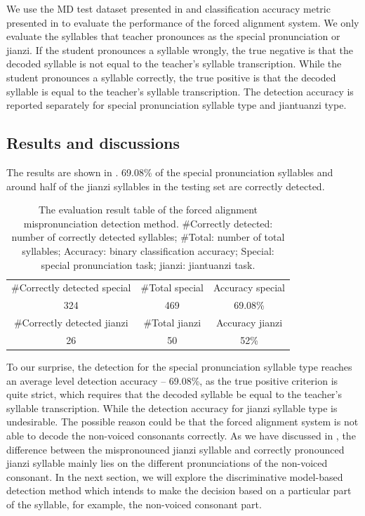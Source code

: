 We use the MD test dataset presented in  and classification accuracy metric presented in  to evaluate the performance of the forced alignment system. We only evaluate the syllables that teacher pronounces as the special pronunciation or \gls{jianzi}. If the student pronounces a syllable wrongly, the true negative is that the decoded syllable is not equal to the teacher's syllable transcription. While the student pronounces a syllable correctly, the true positive is that the decoded syllable is equal to the teacher's syllable transcription. The detection accuracy is reported separately for special pronunciation syllable type and \gls{jiantuanzi} type.

\subsection{Results and discussions}

The results are shown in . 69.08\% of the special pronunciation syllables and around half of the \gls{jianzi} syllables in the testing set are correctly detected.

\begin{table}[ht!]
\centering
\caption{The evaluation result table of the forced alignment mispronunciation detection method. \#Correctly detected: number of correctly detected syllables; \#Total: number of total syllables; Accuracy: binary classification accuracy; Special: special pronunciation task; jianzi: jiantuanzi task.}
\label{tab:ch6:forced_alignment_results}
\begin{tabular}{ccc}
\toprule
\#Correctly detected special & \#Total special & Accuracy special \\
324 & 469 & 69.08\% \\
\midrule
\#Correctly detected jianzi & \#Total jianzi & Accuracy jianzi \\
26 & 50 & 52\% \\
\bottomrule
\end{tabular}
\end{table}

To our surprise, the detection for the special pronunciation syllable type reaches an average level detection accuracy -- 69.08\%, as the true positive criterion is quite strict, which requires that the decoded syllable be equal to the teacher's syllable transcription. While the detection accuracy for \gls{jianzi} syllable type is undesirable. The possible reason could be that the forced alignment system is not able to decode the non-voiced consonants correctly. As we have discussed in , the difference between the mispronounced \gls{jianzi} syllable and correctly pronounced \gls{jianzi} syllable mainly lies on the different pronunciations of the non-voiced consonant. In the next section, we will explore the discriminative model-based detection method which intends to make the decision based on a particular part of the syllable, for example, the non-voiced consonant part.

